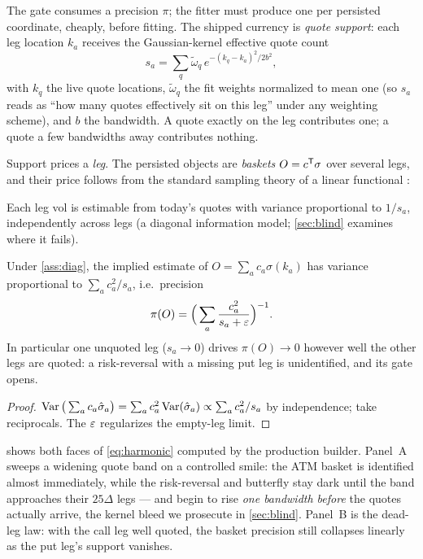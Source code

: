 \documentclass[11pt]{article}
\begin{document}
The gate consumes a precision $\pi$; the fitter must produce one per
persisted coordinate, cheaply, before fitting.  The shipped currency
is \emph{quote support}: each leg location $k_a$ receives the
Gaussian-kernel effective quote count
\begin{equation}
s_a=\sum_q \tilde\omega_q\,
e^{-(k_q-k_a)^2/2b^2},
\label{eq:support}
\end{equation}
with $k_q$ the live quote locations, $\tilde\omega_q$ the fit weights
normalized to mean one (so $s_a$ reads as ``how many quotes
effectively sit on this leg'' under any weighting scheme), and $b$ the
bandwidth.  A quote exactly on the leg contributes one; a quote a few
bandwidths away contributes nothing.

Support prices a \emph{leg}.  The persisted objects are
\emph{baskets} $O=c^{\mathsf{T}}\sigma$ over several legs, and their price
follows from the standard sampling theory of a linear functional
\cite{LehmannCasella1998}:

\begin{assumption}
\label{ass:diag}
Each leg vol is estimable from today's quotes with variance
proportional to $1/s_a$, independently across legs (a diagonal
information model; \cref{sec:blind} examines where it fails).
\end{assumption}

\begin{proposition}
\label{prop:harmonic}
Under \cref{ass:diag}, the implied estimate of $O=\sum_a c_a\sigma(k_a)$
has variance proportional to $\sum_a c_a^2/s_a$, i.e.\ precision
\begin{equation}
\pi(O)=\Big(\sum_a\frac{c_a^2}{s_a+\varepsilon}\Big)^{-1}.
\label{eq:harmonic}
\end{equation}
In particular one unquoted leg ($s_a\to0$) drives $\pi(O)\to0$
however well the other legs are quoted: a risk-reversal with a
missing put leg is unidentified, and its gate opens.
\end{proposition}

\begin{proof}
$\operatorname{Var}\big(\sum_ac_a\hat\sigma_a\big)=\sum_ac_a^2\operatorname{Var}(\hat\sigma_a)
\propto\sum_ac_a^2/s_a$ by independence; take reciprocals.  The
$\varepsilon$ regularizes the empty-leg limit.
\end{proof}

 shows both faces of \eqref{eq:harmonic} computed by
the production builder.  Panel~A sweeps a widening quote band on a
controlled smile: the ATM basket is identified almost immediately,
while the risk-reversal and butterfly stay dark until the band
approaches their $25\Delta$ legs --- and begin to rise \emph{one
bandwidth before} the quotes actually arrive, the kernel bleed we
prosecute in \cref{sec:blind}.  Panel~B is the dead-leg law: with the
call leg well quoted, the basket precision still collapses linearly as
the put leg's support vanishes.
\end{document}
